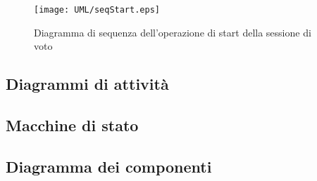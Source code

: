 \begin{figure}[ht]
	\centering
	\texttt{[image: UML/seqStart.eps]}
	\caption{Diagramma di sequenza dell'operazione di start della sessione di voto}
	\label{fig:seqdiagstart}
\end{figure}

\subsection{Diagrammi di attività}
\subsection{Macchine di stato}
\subsection{Diagramma dei componenti}
